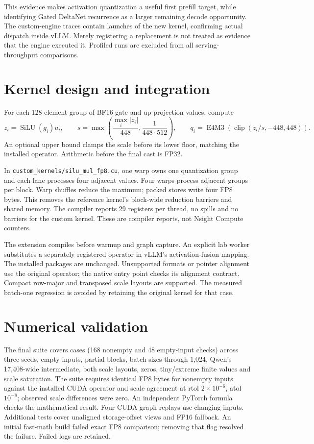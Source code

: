\documentclass[10pt,a4paper]{article}
\begin{document}
This evidence makes activation quantization a useful first prefill target, while
identifying Gated DeltaNet recurrence as a larger remaining decode opportunity.
The custom-engine traces contain \CustomProfileCalls{} launches of the new kernel,
confirming actual dispatch inside vLLM. Merely registering a replacement is not
treated as evidence that the engine executed it. Profiled runs are excluded from
all serving-throughput comparisons.

\section{Kernel design and integration}
For each 128-element group of BF16 gate and up-projection values, compute
\[
 z_i=\operatorname{SiLU}(g_i)u_i,\qquad
 s=\max\left(\frac{\max_i|z_i|}{448},\frac{1}{448\cdot512}\right),\qquad
 q_i=\operatorname{E4M3}\!\left(\operatorname{clip}(z_i/s,-448,448)\right).
\]
An optional upper bound clamps the scale before its lower floor, matching the
installed operator. Arithmetic before the final cast is FP32.

In \texttt{custom\_kernels/silu\_mul\_fp8.cu}, one warp owns one quantization group
and each lane processes four adjacent values. Four warps process adjacent groups
per block. Warp shuffles reduce the maximum; packed stores write four FP8 bytes.
This removes the reference kernel's block-wide reduction barriers and shared
memory. The compiler reports 29 registers per thread, no spills and no barriers
for the custom kernel. These are compiler reports, not Nsight Compute counters.

The extension compiles before warmup and graph capture. An explicit lab worker
substitutes a separately registered operator in vLLM's activation-fusion mapping.
The installed packages are unchanged. Unsupported formats or pointer alignment
use the original operator; the native entry point checks its alignment contract.
Compact row-major and transposed scale layouts are supported. The measured
batch-one regression is avoided by retaining the original kernel for that case.

\section{Numerical validation}
The final suite covers \NumericalCases{} cases (168 nonempty and 48 empty-input
checks) across three seeds, empty inputs,
partial blocks, batch sizes through 1,024, Qwen's 17,408-wide intermediate, both
scale layouts, zeros, tiny/extreme finite values and scale saturation. The suite
requires identical FP8 bytes for nonempty inputs against the installed CUDA operator and scale
agreement at rtol $2\times10^{-6}$, atol $10^{-8}$; observed scale differences
were zero. An independent PyTorch formula checks the mathematical result.
Four CUDA-graph replays use changing inputs. Additional tests cover unaligned
storage-offset views and FP16 fallback. An initial fast-math build failed exact
FP8 comparison; removing that flag resolved the failure. Failed logs are retained.
\end{document}
